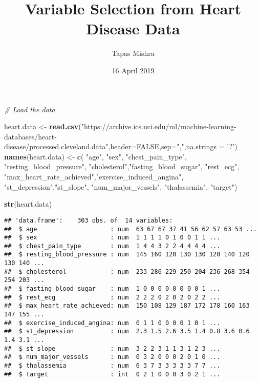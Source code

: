 \documentclass[]{article}
\title{Variable Selection from Heart Disease Data}
\author{Tapas Mishra}
\date{16 April 2019}
\newenvironment{Shaded}{\begin{snugshade}}{\end{snugshade}}
\newcommand{\CommentTok}[1]{\textcolor[rgb]{0.56,0.35,0.01}{\textit{#1}}}
\newcommand{\DataTypeTok}[1]{\textcolor[rgb]{0.13,0.29,0.53}{#1}}
\newcommand{\KeywordTok}[1]{\textcolor[rgb]{0.13,0.29,0.53}{\textbf{#1}}}
\newcommand{\NormalTok}[1]{#1}
\newcommand{\OtherTok}[1]{\textcolor[rgb]{0.56,0.35,0.01}{#1}}
\newcommand{\StringTok}[1]{\textcolor[rgb]{0.31,0.60,0.02}{#1}}
\begin{document}
\maketitle

\begin{Shaded}
\begin{Highlighting}[]
\CommentTok{# Load the data}

\NormalTok{heart.data <-}\StringTok{ }\KeywordTok{read.csv}\NormalTok{(}\StringTok{"https://archive.ics.uci.edu/ml/machine-learning-databases/heart-disease/processed.cleveland.data"}\NormalTok{,}\DataTypeTok{header=}\OtherTok{FALSE}\NormalTok{,}\DataTypeTok{sep=}\StringTok{","}\NormalTok{,}\DataTypeTok{na.strings =} \StringTok{'?'}\NormalTok{)}
\KeywordTok{names}\NormalTok{(heart.data) <-}\StringTok{ }\KeywordTok{c}\NormalTok{( }\StringTok{"age"}\NormalTok{, }\StringTok{"sex"}\NormalTok{, }\StringTok{"chest_pain_type"}\NormalTok{, }\StringTok{"resting_blood_pressure"}\NormalTok{, }\StringTok{"cholesterol"}\NormalTok{,}\StringTok{"fasting_blood_sugar"}\NormalTok{, }\StringTok{"rest_ecg"}\NormalTok{,}
                   \StringTok{"max_heart_rate_achieved"}\NormalTok{,}\StringTok{"exercise_induced_angina"}\NormalTok{, }\StringTok{"st_depression"}\NormalTok{,}\StringTok{"st_slope"}\NormalTok{, }\StringTok{"num_major_vessels"}\NormalTok{, }\StringTok{"thalassemia"}\NormalTok{, }\StringTok{"target"}\NormalTok{)}

\KeywordTok{str}\NormalTok{(heart.data)}
\end{Highlighting}
\end{Shaded}

\begin{verbatim}
## 'data.frame':    303 obs. of  14 variables:
##  $ age                    : num  63 67 67 37 41 56 62 57 63 53 ...
##  $ sex                    : num  1 1 1 1 0 1 0 0 1 1 ...
##  $ chest_pain_type        : num  1 4 4 3 2 2 4 4 4 4 ...
##  $ resting_blood_pressure : num  145 160 120 130 130 120 140 120 130 140 ...
##  $ cholesterol            : num  233 286 229 250 204 236 268 354 254 203 ...
##  $ fasting_blood_sugar    : num  1 0 0 0 0 0 0 0 0 1 ...
##  $ rest_ecg               : num  2 2 2 0 2 0 2 0 2 2 ...
##  $ max_heart_rate_achieved: num  150 108 129 187 172 178 160 163 147 155 ...
##  $ exercise_induced_angina: num  0 1 1 0 0 0 0 1 0 1 ...
##  $ st_depression          : num  2.3 1.5 2.6 3.5 1.4 0.8 3.6 0.6 1.4 3.1 ...
##  $ st_slope               : num  3 2 2 3 1 1 3 1 2 3 ...
##  $ num_major_vessels      : num  0 3 2 0 0 0 2 0 1 0 ...
##  $ thalassemia            : num  6 3 7 3 3 3 3 3 7 7 ...
##  $ target                 : int  0 2 1 0 0 0 3 0 2 1 ...
\end{verbatim}
\end{document}
